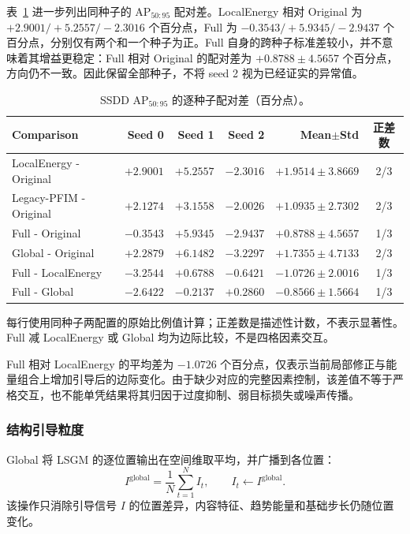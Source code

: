 \documentclass[journal]{IEEEtran}
\begin{document}
表~\ref{tab:paired_ablation} 进一步列出同种子的 $\mathrm{AP}_{50:95}$ 配对差。LocalEnergy 相对 Original 为 $+2.9001/+5.2557/-2.3016$ 个百分点，Full 为 $-0.3543/+5.9345/-2.9437$ 个百分点，分别仅有两个和一个种子为正。Full 自身的跨种子标准差较小，并不意味着其增益更稳定：Full 相对 Original 的配对差为 $+0.8788\pm4.5657$ 个百分点，方向仍不一致。因此保留全部种子，不将 seed 2 视为已经证实的异常值。

\begin{table}[!t]
\centering
\small
\setlength{\tabcolsep}{3pt}
\caption{SSDD AP$_{50:95}$ 的逐种子配对差（百分点）。}
\label{tab:paired_ablation}
\begin{tabular*}{\textwidth}{@{\extracolsep{\fill}}lrrrrc}
\toprule
Comparison & Seed 0 & Seed 1 & Seed 2 & Mean$\pm$Std & 正差数 \\
\midrule
LocalEnergy - Original
& $+2.9001$ & $+5.2557$ & $-2.3016$
& $+1.9514\pm3.8669$ & 2/3 \\
Legacy-PFIM - Original
& $+2.1274$ & $+3.1558$ & $-2.0026$
& $+1.0935\pm2.7302$ & 2/3 \\
Full - Original
& $-0.3543$ & $+5.9345$ & $-2.9437$
& $+0.8788\pm4.5657$ & 1/3 \\
Global - Original
& $+2.2879$ & $+6.1482$ & $-3.2297$
& $+1.7355\pm4.7133$ & 2/3 \\
Full - LocalEnergy
& $-3.2544$ & $+0.6788$ & $-0.6421$
& $-1.0726\pm2.0016$ & 1/3 \\
Full - Global
& $-2.6422$ & $-0.2137$ & $+0.2860$
& $-0.8566\pm1.5664$ & 1/3 \\
\bottomrule
\end{tabular*}
\smallskip
\begin{minipage}{\linewidth}
\footnotesize
每行使用同种子两配置的原始比例值计算；正差数是描述性计数，不表示显著性。Full 减 LocalEnergy 或 Global 均为边际比较，不是四格因素交互。
\end{minipage}
\end{table}

Full 相对 LocalEnergy 的平均差为 $-1.0726$ 个百分点，仅表示当前局部修正与能量组合上增加引导后的边际变化。由于缺少对应的完整因素控制，该差值不等于严格交互，也不能单凭结果将其归因于过度抑制、弱目标损失或噪声传播。

\subsubsection{结构引导粒度}
\label{sec:guidance_granularity}

Global 将 LSGM 的逐位置输出在空间维取平均，并广播到各位置：
\begin{equation}
I^{\mathrm{global}}
=\frac{1}{N}\sum_{t=1}^{N}I_t,\qquad
I_t\leftarrow I^{\mathrm{global}}.
\label{eq:global_guidance}
\end{equation}
该操作只消除引导信号 $I$ 的位置差异，内容特征、趋势能量和基础步长仍随位置变化。
\end{document}

